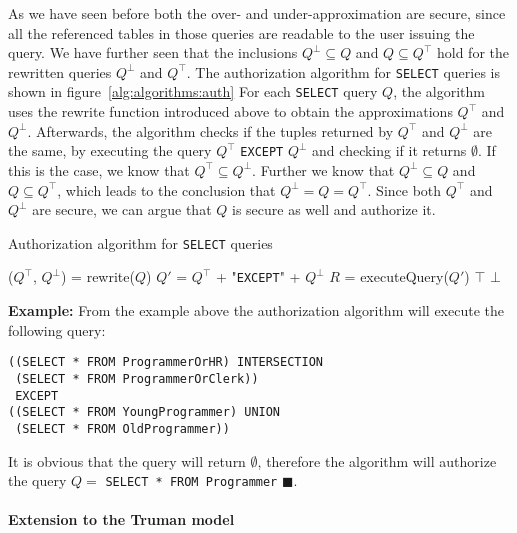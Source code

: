As we have seen before both the over- and under-approximation are secure, since all the referenced tables in those queries are readable to the user issuing the query.
%
We have further seen that the inclusions $Q^\bot \subseteq Q$ and $Q \subseteq Q^\top$ hold for the rewritten queries $Q^\bot$ and $Q^\top$.
%
The authorization algorithm for \texttt{SELECT} queries is shown in figure~\ref{alg:algorithms:auth}
%
For each \texttt{SELECT} query $Q$, the algorithm uses the rewrite function introduced above to obtain the approximations $Q^\top$ and $Q^\bot$.
%
Afterwards, the algorithm checks if the tuples returned by $Q^\top$ and $Q^\bot$ are the same, by executing the query  $Q^\top$ \texttt{EXCEPT} $Q^\bot$ and checking if it returns $\emptyset$.
%
If this is the case, we know that $Q^\top \subseteq Q^\bot$.
%
Further we know that $Q^\bot \subseteq Q$ and $Q \subseteq Q^\top$, which leads to the conclusion that $Q^\bot = Q = Q^\top$.
%
Since both $Q^\top$ and $Q^\bot$ are secure, we can argue that $Q$ is secure as well and authorize it.
%
\begin{algorithm}
\caption{Authorization algorithm for \texttt{SELECT} queries}
\label{alg:algorithms:auth}
	\SetAlgoLined
	($Q^\top$, $Q^\bot$) = rewrite($Q$)\;
	$Q'$ = $Q^\top$ + "\texttt{EXCEPT}" + $Q^\bot$\;
	$R$ = executeQuery($Q'$)\;
		{\Return $\top$ \;}
		{\Return $\bot$ \;}
\end{algorithm}

\smallskip
\noindent
{\bf Example:}
From the example above the authorization algorithm will execute the following query:
\begin{verbatim}
((SELECT * FROM ProgrammerOrHR) INTERSECTION
 (SELECT * FROM ProgrammerOrClerk))
 EXCEPT
((SELECT * FROM YoungProgrammer) UNION
 (SELECT * FROM OldProgrammer))
\end{verbatim}
\noindent
It is obvious that the query will return $\emptyset$, therefore the algorithm will authorize the query $Q = $ \texttt{SELECT * FROM Programmer} $\blacksquare$.

\paragraph{Extension to the Truman model}

